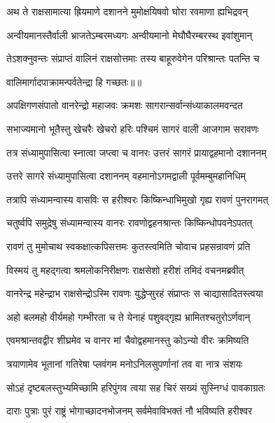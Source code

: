\twolineshloka
{अथ ते राक्षसामात्या ह्रियमाणे दशानने}
{मुमोक्षयिषवो घोरा रवमाणा ह्यभिद्रवन्} %

\twolineshloka
{अन्वीयमानस्तैर्वाली भ्राजतेऽम्बरमध्यगः}
{अन्वीयमानो मेघौघैरम्बरस्थ इवांशुमान्} %

\twolineshloka
{तेऽशक्नुवन्तः संप्राप्तं वालिनं राक्षसोत्तमाः}
{तस्य बाहूरुवेगेन परिश्रान्तः पतन्ति च} %

{वालिमार्गादपाक्रामन्पर्वतेन्द्रा हि गच्छतः॥॥} %

\addtocounter{shlokacount}{1}

\twolineshloka
{अपक्षिगणसंपातो वानरेन्द्रो महाजवः}
{क्रमशः सागरान्सर्वान्संध्याकालमवन्दत} %

\twolineshloka
{सभाज्यमानो भूतैस्तु खेचरैः खेचरो हरिः}
{पश्चिमं सागरं वाली आजगाम सरावणः} %

\twolineshloka
{तत्र संध्यामुपासित्वा स्नात्वा जप्त्वा च वानरः}
{उत्तरं सागरं प्रायाद्वहमानो दशाननम्} %

\twolineshloka
{उत्तरे सागरे संध्यामुपासित्वा दशाननम्}
{वहमानोऽगमद्वाली पूर्वमम्बुमहानिधिम्} %

\twolineshloka
{तत्रापि संध्यामन्वास्य वासविः स हरीश्वरः}
{किष्किन्धाभिमुखो गृह्य रावणं पुनरागमत्} %

\twolineshloka
{चतुर्ष्वपि समुद्रेषु संध्यामन्वास्य वानरः}
{रावणोद्वहनश्रान्तः किष्किन्धोपवनेऽपतत्} %

\twolineshloka
{रावणं तु मुमोचाथ स्वकक्षात्कपिसत्तमः}
{कुतस्त्वमिति चोवाच प्रहसन्रावणं प्रति} %

\twolineshloka
{विस्मयं तु महद्गत्वा श्रमलोकनिरीक्षणः}
{राक्षसेशो हरीशं तमिदं वचनमब्रवीत्} %

\twolineshloka
{वानरेन्द्र महेन्द्राभ राक्षसेन्द्रोऽस्मि रावणः}
{युद्धेप्सुरहं संप्राप्तः स चाद्यासादितस्त्वया} %

\twolineshloka
{अहो बलमहो वीर्यमहो गम्भीरता च ते}
{येनाहं पशुवद्गृह्य भ्रामितश्चतुरोऽर्णवान्} %

\twolineshloka
{एवमश्रान्तवद्वीर शीघ्रमेव च वानर}
{मां चैवोद्वहमानस्तु कोऽन्यो वीरः क्रमिष्यति} %

\twolineshloka
{त्रयाणामेव भूतानां गतिरेषा प्लवंगम}
{मनोऽनिलसुपर्णानां तव वा नात्र संशयः} %

\twolineshloka
{सोऽहं दृष्टबलस्तुभ्यमिच्छामि हरिपुंगव}
{त्वया सह चिरं सख्यं सुस्निग्धं पावकाग्रतः} %

\twolineshloka
{दाराः पुत्राः पुरं राष्ट्रं भोगाच्छादनभोजनम्}
{सर्वमेवाविभक्तं नौ भविष्यति हरीश्वर} %

